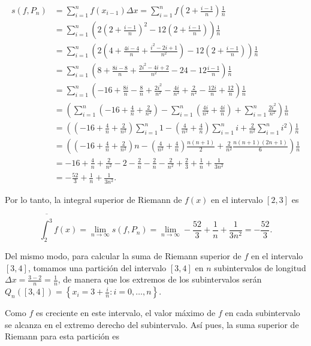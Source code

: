 \documentclass[
  spanish,
  a4paper,
]{scrreport}
\theoremstyle{definition}
\theoremstyle{remark}
\begin{document}
\begin{tcolorbox}
\begin{align*}
s(f,P_n) 
&= \sum_{i=1}^{n} f(x_{i-1}) \Delta x = \sum_{i=1}^{n} f\left(2 + \frac{i-1}{n}\right) \frac{1}{n} \\
&= \sum_{i=1}^{n} \left(2\left(2 + \frac{i-1}{n}\right)^2 - 12\left(2 + \frac{i-1}{n}\right)\right) \frac{1}{n} \\
&= \sum_{i=1}^{n} \left(2\left(4 + \frac{4i-4}{n} + \frac{i^2-2i+1}{n^2}\right) - 12\left(2 + \frac{i-1}{n}\right)\right) \frac{1}{n} \\
&= \sum_{i=1}^{n} \left(8 + \frac{8i-8}{n} + \frac{2i^2-4i+2}{n^2} - 24 - 12\frac{i-1}{n}\right) \frac{1}{n} \\
&= \sum_{i=1}^{n} \left(-16 + \frac{8i}{n}-\frac{8}{n} + \frac{2i^2}{n^2}-\frac{4i}{n^2}+\frac{2}{n^2} - \frac{12i}{n}+\frac{12}{n}\right) \frac{1}{n} \\
&= \left(\sum_{i=1}^{n} \left(-16 + \frac{4}{n} + \frac{2}{n^2}\right) - \sum_{i=1}^n \left(\frac{4i}{n^2} + \frac{4i}{n}\right) + \sum_{i=1}^n \frac{2i^2}{n^2} \right) \frac{1}{n} \\
&= \left(\left(-16 + \frac{4}{n} + \frac{2}{n^2}\right)\sum_{i=1}^{n} 1 - \left(\frac{4}{n^2} + \frac{4}{n}\right) \sum_{i=1}^n i +  \frac{2}{n^2} \sum_{i=1}^n i^2 \right) \frac{1}{n} \\
&= \left(\left(-16 + \frac{4}{n} + \frac{2}{n^2}\right)n - \left(\frac{4}{n^2} + \frac{4}{n}\right) \frac{n(n+1)}{2} +  \frac{2}{n^2} \frac{n(n+1)(2n+1)}{6} \right) \frac{1}{n}\\
&= -16 + \frac{4}{n} + \frac{2}{n^2} - 2 - \frac{2}{n} - \frac{2}{n} - \frac{2}{n^2} + \frac{2}{3} +  \frac{1}{n} + \frac{1}{3n^2} \\
&= -\frac{52}{3} + \frac{1}{n} + \frac{1}{3n^2}.
\end{align*}

Por lo tanto, la integral superior de Riemann de \(f(x)\) en el
intervalo \([2, 3]\) es

\[
\overline{\int_2^3} f(x) 
= \lim_{n \to \infty} s(f,P_n) 
= \lim_{n \to \infty} -\frac{52}{3} + \frac{1}{n} + \frac{1}{3n^2}
= -\frac{52}{3}.
\]

Del mismo modo, para calcular la suma de Riemann superior de \(f\) en el
intervalo \([3,4]\), tomamos una partición del intervalo \([3, 4]\) en
\(n\) subintervalos de longitud
\(\Delta x = \frac{3-2}{n} = \frac{1}{n}\), de manera que los extremos
de los subintervalos serán
\(Q_n([3,4]) = \left\{x_i = 3 + \frac{i}{n}: i = 0, \ldots, n\right\}\).

Como \(f\) es creciente en este intervalo, el valor máximo de \(f\) en
cada subintervalo se alcanza en el extremo derecho del subintervalo. Así
pues, la suma superior de Riemann para esta partición es


\end{tcolorbox}
\end{document}
